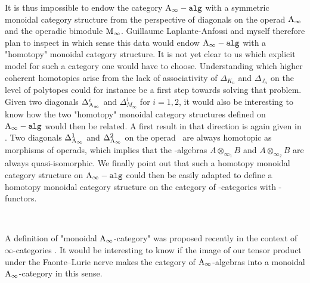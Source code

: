 \documentclass[twoside, 12pt]{amsart}
\theoremstyle{remark}
\begin{document}
It is thus impossible to endow the category $\mathtt{\mathrm{A}_\infty -alg}$ with a symmetric monoidal category structure from the perspective of diagonals on the operad $\mathrm{A}_\infty$ and the operadic bimodule $\mathrm{M}_\infty$. Guillaume Laplante-Anfossi and myself therefore plan to inspect in which sense this data would endow $\mathtt{\mathrm{A}_\infty -alg}$ with a "homotopy" monoidal category structure. It is not yet clear to us which explicit model for such a category one would have to choose. Understanding which higher coherent homotopies arise from the lack of associativity of $\Delta_{K_n}$ and $\Delta_{J_n}$ on the level of polytopes could for instance be a first step towards solving that problem.
Given two diagonals $\Delta_{\mathrm{A}_\infty}^i$ and $\Delta_{M_\infty}^i$ for $i=1,2$, it would also be interesting to know how the two "homotopy" monoidal category structures defined on $\mathtt{\mathrm{A}_\infty -alg}$ would then be related.
A first result in that direction is again given in \cite{markl-assoc}. Two diagonals $\Delta_{\mathrm{A}_\infty}^1$ and $\Delta_{\mathrm{A}_\infty}^2$ on the operad \Ainf\ are always homotopic as morphisms of operads, which implies that the \Ainf -algebras $A \otimes_{\infty_1} B$ and $A \otimes_{\infty_2} B$ are always quasi-isomorphic. We finally point out that such a homotopy monoidal category structure on $\mathtt{\mathrm{A}_\infty -alg}$ could then be easily adapted to define a homotopy monoidal category structure on the category of \Ainf -categories with \Ainf -functors.




~

\noindent {}

A definition of "monoidal $\mathrm{A}_\infty$-category" was proposed recently in the context of $\infty$-categories \cite[Definition A.5.3]{Pascaleff18}.
It would be interesting to know if the image of our tensor product under the Faonte--Lurie nerve \cite{Faonte17} makes the category of $\mathrm{A}_\infty$-algebras into a monoidal $\mathrm{A}_\infty$-category in this sense. 
\end{document}
